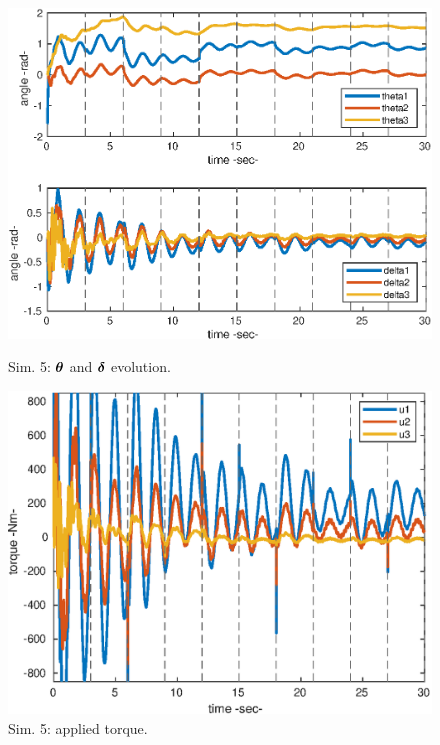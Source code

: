 \begin{center}
\begin{figure}[h!]
\begin{minipage}[h!]{0.45\linewidth}
\begin{center}
\includegraphics[scale=0.52]{figures/3_2_thetadelta.eps}
\caption{\label{5_qt}Sim. 5: $\boldsymbol{\theta}$ and $\boldsymbol{\delta}$ evolution.}
\vspace{1cm}
\hspace{-0.1cm}\includegraphics[scale=0.51]{figures/3_2_effort.eps}
\caption{\label{5_u}Sim. 5: applied torque.}
\end{center}
\end{minipage}
\end{figure}
\end{center}